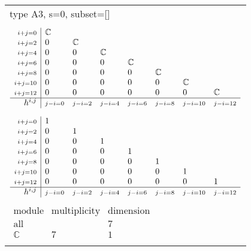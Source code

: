 \documentclass[crop,border=2mm]{standalone}
\begin{document}
\begin{tabular}{l}
{\huge type A3, s=0, subset=[]}\\ \\


$\displaystyle
\begin{array}{r|l l l l l l l}
	{\scriptstyle i+j=0}&\mathbb{C}&&&&&&\\
	{\scriptstyle i+j=2}&0&\mathbb{C}&&&&&\\
	{\scriptstyle i+j=4}&0&0&\mathbb{C}&&&&\\
	{\scriptstyle i+j=6}&0&0&0&\mathbb{C}&&&\\
	{\scriptstyle i+j=8}&0&0&0&0&\mathbb{C}&&\\
	{\scriptstyle i+j=10}&0&0&0&0&0&\mathbb{C}&\\
	{\scriptstyle i+j=12}&0&0&0&0&0&0&\mathbb{C}\\
	\hline h^{i,j}&{\scriptstyle j-i=0}&{\scriptstyle j-i=2}&{\scriptstyle j-i=4}&{\scriptstyle j-i=6}&{\scriptstyle j-i=8}&{\scriptstyle j-i=10}&{\scriptstyle j-i=12}
\end{array}
$ \\ \\


$\displaystyle
\begin{array}{r|l l l l l l l}
	{\scriptstyle i+j=0}&1&&&&&&\\
	{\scriptstyle i+j=2}&0&1&&&&&\\
	{\scriptstyle i+j=4}&0&0&1&&&&\\
	{\scriptstyle i+j=6}&0&0&0&1&&&\\
	{\scriptstyle i+j=8}&0&0&0&0&1&&\\
	{\scriptstyle i+j=10}&0&0&0&0&0&1&\\
	{\scriptstyle i+j=12}&0&0&0&0&0&0&1\\
	\hline h^{i,j}&{\scriptstyle j-i=0}&{\scriptstyle j-i=2}&{\scriptstyle j-i=4}&{\scriptstyle j-i=6}&{\scriptstyle j-i=8}&{\scriptstyle j-i=10}&{\scriptstyle j-i=12}
\end{array}
$ \\ \\


$\displaystyle
\begin{array}{rll}
	\text{module}&\text{multiplicity}&\text{dimension} \\ \hline \text{all}&&7 \\
	\mathbb{C}&7&1
\end{array}
$ \\ \\

\end{tabular}
\end{document}
